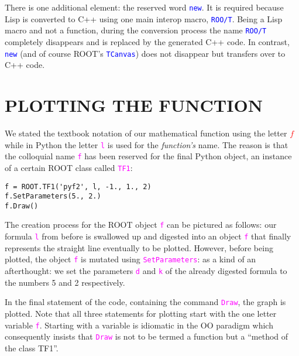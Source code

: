 \documentclass[twocolumn]{article}
\begin{document}
There is one additional element: the reserved word \texttt{\textcolor{blue}{new}}. It is required because Lisp is converted to C++ using one main interop macro, \texttt{\textcolor{blue}{ROO/T}}. Being a Lisp macro and not a function, during the conversion process the name \texttt{\textcolor{blue}{ROO/T}} completely disappears and is replaced by the generated C++ code. In contrast, \texttt{\textcolor{blue}{new}} (and of course ROOT’s \texttt{\textcolor{blue}{TCanvas}}) does not disappear but transfers over to C++ code.

\section{PLOTTING THE FUNCTION}
We stated the textbook notation of our mathematical function using the letter \textcolor{red}{$f$} while in Python the letter \texttt{\textcolor{magenta}{l}} is used for the \textit{function's} name. The reason is that the colloquial name \texttt{\textcolor{magenta}{f}} has been reserved for the final Python object, an instance of a certain ROOT class called \texttt{\textcolor{magenta}{TF1}}:
{\color{magenta}\begin{verbatim}
f = ROOT.TF1('pyf2', l, -1., 1., 2)
f.SetParameters(5., 2.)
f.Draw()
\end{verbatim}}
The creation process for the ROOT object \texttt{\textcolor{magenta}{f}} can be pictured as follows: our formula \texttt{\textcolor{magenta}{l}} from before is
swallowed up and digested into an object \texttt{\textcolor{magenta}{f}} that finally represents the straight line eventually to be plotted. However, before being plotted, the object \texttt{\textcolor{magenta}{f}} is mutated using \texttt{\textcolor{magenta}{SetParameters}}: as a kind of an afterthought: we set the parameters \texttt{\textcolor{magenta}{d}} and \texttt{\textcolor{magenta}{k}} of the already digested formula to the numbers 5 and 2 respectively.

In the final statement of the code, containing the command \texttt{\textcolor{magenta}{Draw}}, the graph is plotted. Note that all three statements for plotting start with the one letter variable \texttt{\textcolor{magenta}{f}}. Starting with a variable is idiomatic in the OO paradigm which consequently insists that \texttt{\textcolor{magenta}{Draw}} is not to be termed a function but a “method of the class TF1”.
\end{document}
